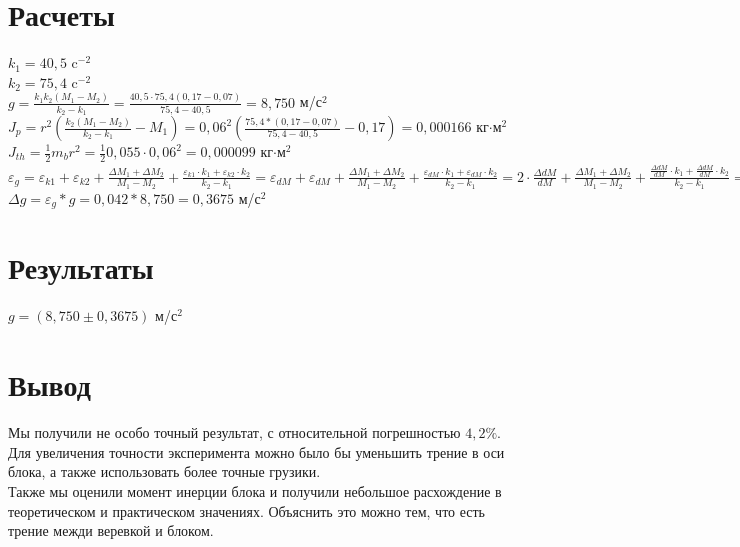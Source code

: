 \documentclass[12pt]{article}
\begin{document}
	\section{Расчеты}
	$k_1=40{,}5$ c$^{-2}$\\
	$k_2=75{,}4$ c$^{-2}$\\
	$g=\frac{k_1k_2(M_1-M_2)}{k_2-k_1}=\frac{40,5\cdot75,4(0,17-0,07)}{75,4-40,5}=8{,}750$ м/с$^2$\\
	$J_p=r^2(\frac{k_2(M_1-M_2)}{k_2-k_1}-M_1)=0,06^2(\frac{75,4*(0,17-0,07)}{75,4-40,5}-0{,}17)=0{,}000166$ кг$\cdot$м$^2$\\
	$J_{th}=\frac{1}{2}m_br^2=\frac{1}{2}0{,}055\cdot0{,}06^2=0{,}000099$ кг$\cdot$м$^2$\\
	$\varepsilon_g=\varepsilon_{k1}+\varepsilon_{k2}+\frac{\Delta M_1+\Delta M_2}{M_1-M_2}+\frac{\varepsilon_{k1}\cdot k_1+\varepsilon_{k2}\cdot k_2}{k_2-k_1}=\varepsilon_{dM}+\varepsilon_{dM}+\frac{\Delta M_1+\Delta M_2}{M_1-M_2}+\frac{\varepsilon_{dM}\cdot k_1+\varepsilon_{dM}\cdot k_2}{k_2-k_1}=2\cdot\frac{\Delta dM}{dM}+\frac{\Delta M_1+\Delta M_2}{M_1-M_2}+\frac{\frac{\Delta dM}{dM}\cdot k_1+\frac{\Delta dM}{dM}\cdot k_2}{k_2-k_1}=2\cdot\frac{0,0001}{0,02}+\frac{0,0007+0,0009}{0,170-0,070}+\frac{\frac{0,0001}{0,02}\cdot40,5+\frac{0,0001}{0,02}\cdot75,4}{75,4-40,5}=0,042$\\
	$\Delta g=\varepsilon_g*g=0{,}042*8{,}750=0{,}3675$ м/с$^2$\\
	\section{Результаты}
	$g=(8{,}750\pm 0{,}3675)$ м/с$^2$\\
	\section{Вывод}
	Мы получили не особо точный результат, с относительной погрешностью $4{,}2\%$. Для увеличения точности эксперимента можно было бы уменьшить трение в оси блока, а также использовать более точные грузики.\\
	Также мы оценили момент инерции блока и получили небольшое расхождение в теоретическом и практическом значениях. Объяснить это можно тем, что есть трение межди веревкой и блоком. 
\end{document}
